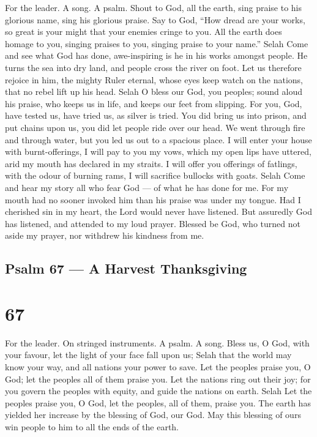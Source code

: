 For the leader. A song. A psalm.  Shout to God, all the
earth,  sing praise to his glorious name, sing his glorious
praise.  Say to God, ``How dread are your works, so great is
your might that your enemies cringe to you.  All the earth
does homage to you, singing praises to you, singing praise to your
name.'' Selah  Come and see what God has done, awe-inspiring
is he in his works amongst people.  He turns the sea into
dry land, and people cross the river on foot. Let us therefore rejoice
in him,  the mighty Ruler eternal, whose eyes keep watch on
the nations, that no rebel lift up his head. Selah  O bless
our God, you peoples; sound aloud his praise,  who keeps us
in life, and keeps our feet from slipping.  For you, God,
have tested us, have tried us, as silver is tried.  You did
bring us into prison, and put chains upon us,  you did let
people ride over our head. We went through fire and through water, but
you led us out to a spacious place.  I will enter your
house with burnt-offerings, I will pay to you my vows, 
which my open lips have uttered, arid my mouth has declared in my
straits.  I will offer you offerings of fatlings, with the
odour of burning rams, I will sacrifice bullocks with goats. Selah
 Come and hear my story all who fear God --- of what he has
done for me.  For my mouth had no sooner invoked him than
his praise was under my tongue.  Had I cherished sin in my
heart, the Lord would never have listened.  But assuredly
God has listened, and attended to my loud prayer.  Blessed
be God, who turned not aside my prayer, nor withdrew his kindness from
me.

\hypertarget{psalm-67-a-harvest-thanksgiving}{%
\subsection{Psalm 67 --- A Harvest
Thanksgiving}\label{psalm-67-a-harvest-thanksgiving}}

\hypertarget{section-66}{%
\section{67}\label{section-66}}

For the leader. On stringed instruments. A psalm. A song. 
Bless us, O God, with your favour, let the light of your face fall upon
us; Selah  that the world may know your way, and all nations
your power to save.  Let the peoples praise you, O God; let
the peoples all of them praise you.  Let the nations ring
out their joy; for you govern the peoples with equity, and guide the
nations on earth. Selah  Let the peoples praise you, O God,
let the peoples, all of them, praise you.  The earth has
yielded her increase by the blessing of God, our God.  May
this blessing of ours win people to him to all the ends of the earth.

